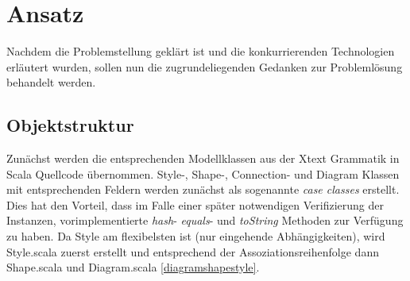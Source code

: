 \chapter{Ansatz}\label{ansatz}
Nachdem die Problemstellung geklärt ist und die konkurrierenden Technologien erläutert wurden, sollen nun die zugrundeliegenden Gedanken zur Problemlösung behandelt werden.
\section{Objektstruktur}
Zunächst werden die entsprechenden Modellklassen aus der Xtext Grammatik in Scala Quellcode übernommen. Style-, Shape-, Connection- und Diagram Klassen mit entsprechenden Feldern werden zunächst als sogenannte \textit{case classes} erstellt. Dies hat den Vorteil, dass im Falle einer später notwendigen Verifizierung der Instanzen, vorimplementierte \textit{hash}- \textit{equals}- und \textit{toString} Methoden zur Verfügung zu haben. Da Style am flexibelsten ist (nur eingehende Abhängigkeiten), wird Style.scala zuerst erstellt und entsprechend der Assoziationsreihenfolge dann Shape.scala und Diagram.scala \ref{diagramshapestyle}.
